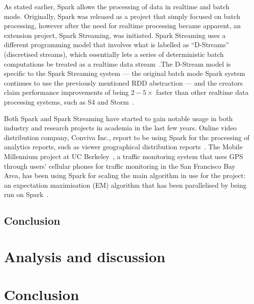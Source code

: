 \documentclass[a4paper,11pt]{article}
\begin{document}
As stated earlier, Spark allows the processing of data in realtime and batch mode. Originally, Spark was released as a
project that simply focused on batch processing, however after the need for realtime processing became apparent, an
extension project, Spark Streaming, was initiated. Spark Streaming uses a different programming model that involves what
is labelled as ``D-Streams'' (discretised streams), which essentially lets a series of deterministic batch computations
be treated as a realtime data stream~\cite{zaharia2012discretized}.The D-Stream model is specific to the Spark Streaming
system --- the original batch mode Spark system continues to use the previously mentioned RDD abstraction --- and the
creators claim performance improvements of being $2-5\times$ faster than  other realtime data processing systems, such as S4
and Storm~\cite{zaharia2013discretized}.

Both Spark and Spark Streaming have started to gain notable usage in both industry and research projects in academia in
the last few years. Online video distribution company, Conviva Inc., report to be using Spark for the processing of
analytics reports, such as viewer geographical distribution reports~\cite{web_spark_conviva,zaharia2012fast}. The Mobile
Millennium project at UC Berkeley~\cite{web_spark_mmp}, a traffic monitoring system that uses GPS through users'
cellular phones for traffic monitoring in the San Francisco Bay Area, has been using Spark for scaling the main algorithm
in use for the project: an expectation maximisation (EM) algorithm that has been parallelised by being run on Spark~\cite{hunter2011scaling}.



\subsection{Conclusion} %
\label{sub:processing_conclusion}




\section{Analysis and discussion} %
\label{sec:analysis_and_discussion}



\section{Conclusion} %
\label{sec:conclusion}


\newpage



\end{document}
